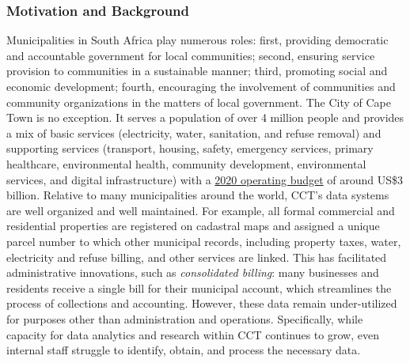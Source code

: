 \documentclass[
]{WileySix}
\begin{document}
\hypertarget{motivation-and-background-6}{%
\subsubsection{Motivation and Background}\label{motivation-and-background-6}}

Municipalities in South Africa play numerous roles: first, providing democratic and accountable government for local communities; second, ensuring service provision to communities in a sustainable manner; third, promoting social and economic development; fourth, encouraging the involvement of communities and community organizations in the matters of local government. The City of Cape Town is no exception. It serves a population of over 4 million people and provides a mix of basic services (electricity, water, sanitation, and refuse removal) and supporting services (transport, housing, safety, emergency services, primary healthcare, environmental health, community development, environmental services, and digital infrastructure) with a \href{http://resource.capetown.gov.za/documentcentre/Documents/Financial\%20documents/1920AdjBudget_Ann1_1_OpexAdjSummary_May2020.pdf}{2020 operating budget} of around US\$3 billion. Relative to many municipalities around the world, CCT's data systems are well organized and well maintained. For example, all formal commercial and residential properties are registered on cadastral maps and assigned a unique parcel number to which other municipal records, including property taxes, water, electricity and refuse billing, and other services are linked. This has facilitated administrative innovations, such as \emph{consolidated billing}: many businesses and residents receive a single bill for their municipal account, which streamlines the process of collections and accounting. However, these data remain under-utilized for purposes other than administration and operations. Specifically, while capacity for data analytics and research within CCT continues to grow, even internal staff struggle to identify, obtain, and process the necessary data.
\end{document}
